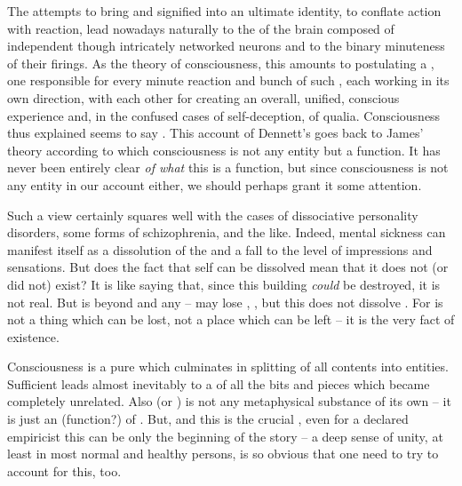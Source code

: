 The attempts to bring  and signified into an ultimate identity, to
conflate action with reaction, lead nowadays naturally to the  of
the brain composed of independent though intricately networked neurons and to
the binary minuteness of their firings.  As the theory of consciousness,
this amounts to postulating a , one  responsible
for every minute reaction and bunch of such , each working in its own
direction,  with each other for creating an overall, unified,
conscious experience and, in the confused cases of self-deception, of qualia.
Consciousness thus explained seems to say .  This
account of Dennett's goes back to James' theory according to which consciousness
is not any entity but a function.  It has never been entirely clear {\em of
  what} this is a function, but since consciousness is not any entity in our
account either, we should perhaps grant it some attention.

\pa Such a view certainly squares well with the cases of dissociative personality
disorders, some forms of schizophrenia, and the like.  Indeed, mental sickness
can manifest itself as a dissolution of the  and a
fall to the level of  impressions and sensations.  But does the
fact that self can be dissolved mean that it does not (or did not) exist?  It is
like saying that, since this building {\em could} be destroyed, it is not real. But
 is beyond and  any  -- 
may lose ,  , but this does not dissolve
. For  is not a thing which can be lost, not a place which can
be left -- it is the very fact of  existence.

Consciousness is a pure  which culminates in 
splitting of all contents into  entities.  Sufficient
 leads almost inevitably to  a  of
all the bits and pieces which became completely unrelated.  Also  (or
) is not any metaphysical substance of its own -- it is just an
 (function?) of .  But, and this is the crucial
, even for a declared empiricist this can be only the beginning of the
story -- a deep sense of unity, at least in most normal and healthy persons, is
so obvious that one need to try to account for this, too.

